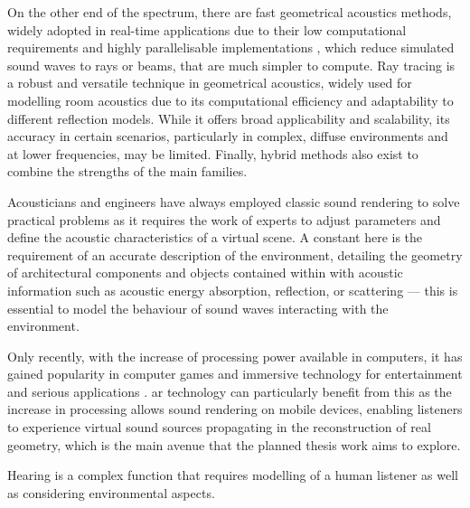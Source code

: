 On the other end of the spectrum, there are fast geometrical acoustics methods, widely adopted in real-time applications due to their low computational requirements and highly parallelisable implementations \citep{cowan2010gpu}, which reduce simulated sound waves to rays or beams, that are much simpler to compute. Ray tracing is a robust and versatile technique in geometrical acoustics, widely used for modelling room acoustics due to its computational efficiency and adaptability to different reflection models. While it offers broad applicability and scalability, its accuracy in certain scenarios, particularly in complex, diffuse environments and at lower frequencies, may be limited. Finally, hybrid methods also exist to combine the strengths of the main families.\par
Acousticians and engineers have always employed classic sound rendering to solve practical problems as it requires the work of experts to adjust parameters and define the acoustic characteristics of a virtual scene. A constant here is the requirement of an accurate description of the environment, detailing the geometry of architectural components and objects contained within with acoustic information such as acoustic energy absorption, reflection, or scattering --- this is essential to model the behaviour of sound waves interacting with the environment. \par
Only recently, with the increase of processing power available in computers, it has gained popularity in computer games and immersive technology for entertainment and serious applications \citep{zhang18}. \acrshort{ar} technology can particularly benefit from this as the increase in processing allows sound rendering on mobile devices, enabling listeners to experience virtual sound sources propagating in the reconstruction of real geometry, which is the main avenue that the planned thesis work aims to explore.\par

Hearing is a complex function that requires modelling of a human listener as well as considering environmental aspects.

